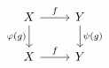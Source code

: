 \documentclass{article}
\begin{document}
    \begin{equation*}
        \begin{tikzcd}
            X \ar[r, "f"] \ar[d, "\phi\l(g\r)"'] & Y \ar[d, "\psi\l(g\r)"] \\
            X \ar[r, "f"] & Y
        \end{tikzcd}
    \end{equation*}
\end{document}
